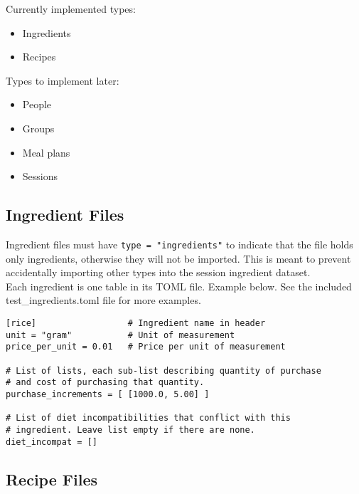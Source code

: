 \documentclass{article}
\begin{document}
Currently implemented types: 
\begin{itemize}
	\item Ingredients
	\item Recipes
\end{itemize}

Types to implement later: 
\begin{itemize}
	\item People 
	\item Groups
	\item Meal plans 
	\item Sessions
\end{itemize}

\subsection{Ingredient Files}
Ingredient files must have \verb|type = "ingredients"| to indicate that the file holds only ingredients, otherwise they will not be imported. This is meant to prevent accidentally
importing other types into the session ingredient dataset. \\

Each ingredient is one table in its TOML file. Example below. See the included test\_ingredients.toml file for more examples. 

\begin{verbatim}
[rice]                  # Ingredient name in header
unit = "gram"           # Unit of measurement
price_per_unit = 0.01   # Price per unit of measurement 

# List of lists, each sub-list describing quantity of purchase 
# and cost of purchasing that quantity. 
purchase_increments = [ [1000.0, 5.00] ]

# List of diet incompatibilities that conflict with this 
# ingredient. Leave list empty if there are none. 
diet_incompat = []
\end{verbatim}

\subsection{Recipe Files}
\end{document}
